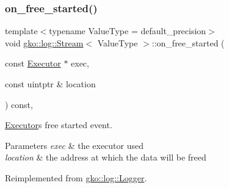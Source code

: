 \subsubsection{\texorpdfstring{on\+\_\+free\+\_\+started()}{on\_free\_started()}}
{\footnotesize\ttfamily template$<$typename Value\+Type  = default\+\_\+precision$>$ \\
void \hyperlink{classgko_1_1log_1_1Stream}{gko\+::log\+::\+Stream}$<$ Value\+Type $>$\+::on\+\_\+free\+\_\+started (\begin{DoxyParamCaption}\item[{const \hyperlink{classgko_1_1Executor}{Executor} $\ast$}]{exec,  }\item[{const uintptr \&}]{location }\end{DoxyParamCaption}) const\hspace{0.3cm}{\ttfamily [override]}, {\ttfamily [virtual]}}



\hyperlink{classgko_1_1Executor}{Executor}\textquotesingle{}s free started event. 


\begin{DoxyParams}{Parameters}
{\em exec} & the executor used \\
\hline
{\em location} & the address at which the data will be freed \\
\hline
\end{DoxyParams}


Reimplemented from \hyperlink{classgko_1_1log_1_1Logger}{gko\+::log\+::\+Logger}.

\mbox{\label{classgko_1_1log_1_1Stream_a80953e058d3b63f1d931712368aec630}} 
